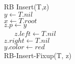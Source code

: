 \begin{algorithm}[H]
\SetAlgoLined
\LinesNumbered

            RB Insert(T,z)\\
            $y\gets T.nil$
            \\
            $x\gets T.root$\\
             $z.p \gets y$\\
             
              \
             \
             \
             {$z.left \gets T.nil$}\\
             {$z.right \gets T.nil$}\\
             {$y.color \gets red$}\\
             RB-Insert-Fixup(T, z)

 
\end{algorithm}
